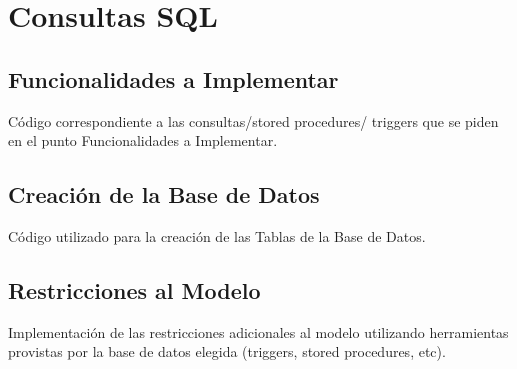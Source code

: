 \section{Consultas SQL}

\subsection{Funcionalidades a Implementar}
Código correspondiente a las consultas/stored procedures/ triggers que se piden en el punto Funcionalidades a Implementar.



\newpage
\subsection{Creaci\'on de la Base de Datos}
C\'odigo utilizado para la creaci\'on de las Tablas de la Base de Datos.



\newpage
\subsection{Restricciones al Modelo}
Implementación de las restricciones adicionales al modelo utilizando herramientas provistas por la base de datos elegida (triggers, stored procedures, etc).

